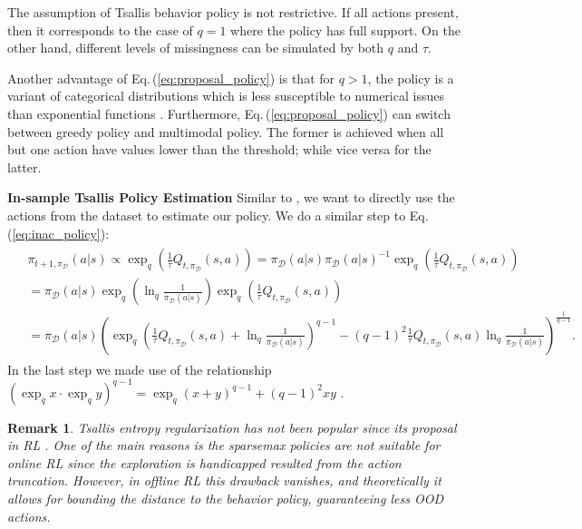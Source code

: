 \documentclass{article}
\newtheorem*{remark}{Remark}
\newcommand{\AdaBracket}[1]{\left(#1\right)}
\newcommand{\expq}[1]{\exp_{q}\!#1}
\newcommand{\eq}[1]{Eq.\,(#1)}
\newcommand{\datasetPolicy}{\pi_{\mathcal{D}}}
\begin{document}
The assumption of Tsallis behavior policy is not restrictive.
If all actions present, then it corresponds to the case of $q=1$ where the policy has full support.
On the other hand, different levels of missingness can be simulated by both $q$ and $\tau$.

Another advantage of \eq{\ref{eq:proposal_policy}} is that for $q>1$, the policy is a variant of categorical distributions which is less susceptible to numerical issues than exponential functions \cite{Tsai2021-selfsupervisedRelativePredictiveCoding}.
Furthermore, \eq{\ref{eq:proposal_policy}} can switch between greedy policy and multimodal policy.
The former is achieved when all but one action have values lower than the threshold; while vice versa for the latter.


\textbf{In-sample Tsallis Policy Estimation}
Similar to \cite{Xiao2023-InSampleSoftmax}, we want to directly use the actions from the dataset to estimate our policy.
We do a similar step to \eq{\ref{eq:inac_policy}}:
\begin{align}
    \begin{split}
        &\pi_{t+1,\datasetPolicy} (a|s) \propto \exp_q \AdaBracket{\frac{1}{\tau} Q_{t, \datasetPolicy}(s,a)} = \datasetPolicy(a|s) \datasetPolicy(a|s)^{-1} \exp_q\AdaBracket{\frac{1}{\tau}Q_{t, \datasetPolicy}(s,a)} \\
        &= \datasetPolicy(a|s)  \exp_q{\AdaBracket{\ln_q{\frac{1}{\datasetPolicy(a|s)}}}} \exp_q\AdaBracket{\frac{1}{\tau}Q_{t, \datasetPolicy}(s,a)}\\
        &=  \datasetPolicy(a|s) {\AdaBracket{ \exp_q\AdaBracket{\frac{1}{\tau}Q_{t, \datasetPolicy}(s,a) + \ln_q\frac{1}{\datasetPolicy(a|s)}}^{q-1} - (q-1)^2 \frac{1}{\tau}Q_{t, \datasetPolicy}(s,a)  \ln_q{\frac{1}{\datasetPolicy(a|s)}} }^{\frac{1}{q-1}}}.
        \label{eq:tsallis_inac_policy_thoery}
    \end{split}
\end{align}
In the last step we made use of the relationship $\AdaBracket{\expq{x}\cdot \expq{y}}^{q-1} = \expq{\AdaBracket{x+y}}^{q-1} + (q-1)^2 xy$ \cite{Yamano2004-properties-qlogexp}.

\begin{remark}
    Tsallis entropy regularization has not been popular since its proposal in RL \cite{Lee2018-TsallisRAL}.
    One of the main reasons is the sparsemax policies are not suitable for online RL since the exploration is handicapped resulted from the action truncation.
    However, in offline RL this drawback vanishes, and theoretically it allows for bounding the distance to the behavior policy, guaranteeing less OOD actions.
\end{remark}
\end{document}
